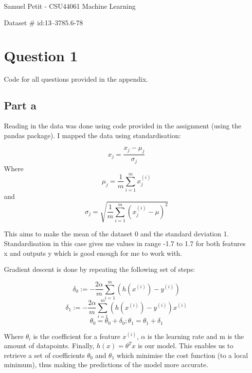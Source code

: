 \documentclass[10pt]{article}
\begin{document}
{\centering
    Samuel Petit - CSU44061 Machine Learning
    \par
    Dataset \# id:13--3785.6-78 
    \par
}
\section*{Question 1}
Code for all questions provided in the appendix.
\subsection*{Part a}
Reading in the data was done using code provided in the assignment (using the pandas package).
I mapped the data using standardisation:

\begin{equation*}
    x_{j} = \frac{x_{j} - \mu_{j}}{\sigma_{j}} 
\end{equation*}
Where 
\begin{equation*}
    \mu_{j} = \frac{1}{m} \sum_{i=1}^{m}x_{j}^{(i)}
\end{equation*}
and
\begin{equation*}
    \sigma_{j} = \sqrt{\frac{1}{m}\sum_{i=1}^{m}(x_{j}^{(i)} - \mu)^{2}}
\end{equation*}

This aims to make the mean of the dataset 0 and the standard deviation 1.
Standardisation in this case gives me values in 
range -1.7 to 1.7 for both features x and outputs y which is good enough for me to work with.

\vspace{5mm} %

Gradient descent is done by repeating the following set of steps:

\begin{equation*}
    \delta_{0} := - \frac{2\alpha}{m} \sum_{i=1}^{m}(h(x^{(i)}) - y^{(i)})
\end{equation*}
\begin{equation*}
    \delta_{1} := - \frac{2\alpha}{m} \sum_{i=1}^{m}(h(x^{(i)}) - y^{(i)})x^{(i)}
\end{equation*}
\begin{equation*}
    \theta_{0} = \theta_{0} + \delta_{0}; \theta_{1} = \theta_{1} + \delta_{1} 
\end{equation*}

Where $\theta_{i}$ is the coefficient for a feature $x^{(i)}$, $\alpha$ is the learning rate
and m is the amount of datapoints. Finally, $h(x) = \theta^{T}x$ is our model. This enables us to
retrieve a set of coefficients $\theta_{0}$ and $\theta_{1}$ which minimise the cost function (to a local minimum),
thus making the predictions of the model more accurate. 
\end{document}
